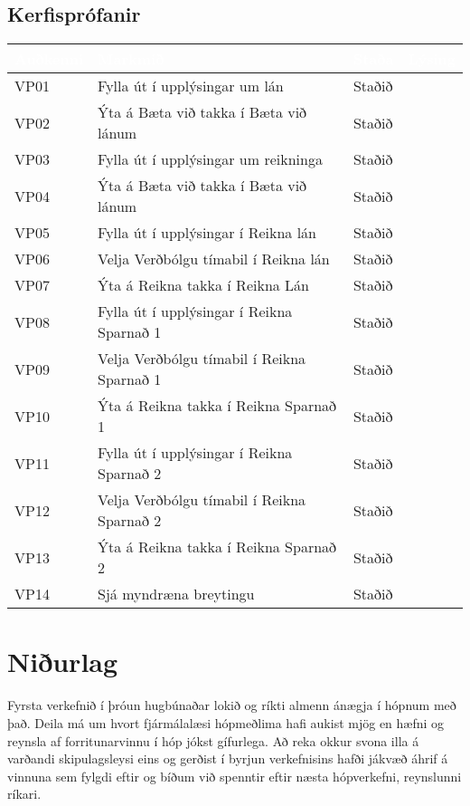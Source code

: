 \documentclass[a4paper,10pt]{article}
\begin{document}
\subsection{Kerfisprófanir}
\begin{center}
    \begin{tabular}{| l | p{6cm} | l | l |}
    \hline
    \rowcolor{LightBlue!65}
     \textcolor{White}{Auðkenni} & \textcolor{White}{Markmið} & \textcolor{White}{Staða} & \textcolor{White}{Lýsing} \\ 
     \hline
     \hline
    \rowcolor{LightCol!30}
    VP01 & Fylla út í upplýsingar um lán & Staðið & \\ \hline
    VP02 & Ýta á Bæta við takka í Bæta við lánum & Staðið & \\ \hline
    \rowcolor{LightCol!30}
    VP03 & Fylla út í upplýsingar um reikninga & Staðið & \\ \hline
    VP04 & Ýta á Bæta við takka í Bæta við lánum & Staðið & \\ \hline
    \rowcolor{LightCol!30}
    VP05 & Fylla út í upplýsingar í Reikna lán & Staðið & \\ \hline
    VP06 & Velja Verðbólgu tímabil í Reikna lán & Staðið & \\ \hline
    \rowcolor{LightCol!30}
    VP07 & Ýta á Reikna takka í Reikna Lán & Staðið & \\ \hline
    VP08 & Fylla út í upplýsingar í Reikna Sparnað 1& Staðið & \\ \hline
    \rowcolor{LightCol!30}
    VP09 & Velja Verðbólgu tímabil í Reikna Sparnað 1 & Staðið & \\ \hline
    VP10 & Ýta á Reikna takka í Reikna Sparnað 1 & Staðið & \\ \hline
    \rowcolor{LightCol!30}
    VP11 & Fylla út í upplýsingar í Reikna Sparnað 2& Staðið & \\ \hline
    VP12 & Velja Verðbólgu tímabil í Reikna Sparnað 2 & Staðið & \\ \hline
    \rowcolor{LightCol!30}
    VP13 & Ýta á Reikna takka í Reikna Sparnað 2 & Staðið & \\ \hline
    VP14 & Sjá myndræna breytingu & Staðið & \\ \hline    
    \end{tabular}
\end{center}

\newpage

\section{Niðurlag}
Fyrsta verkefnið í þróun hugbúnaðar lokið og ríkti almenn ánægja í hópnum með það.  Deila má um hvort fjármálalæsi hópmeðlima hafi aukist mjög en hæfni og reynsla af forritunarvinnu í hóp jókst gífurlega.  Að reka okkur svona illa á varðandi skipulagsleysi eins og gerðist í byrjun verkefnisins hafði jákvæð áhrif á vinnuna sem fylgdi eftir og bíðum við spenntir eftir næsta hópverkefni, reynslunni ríkari.  
\end{document}
